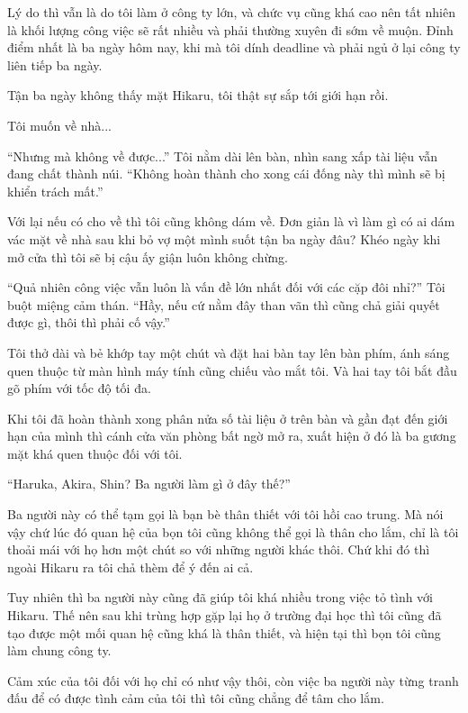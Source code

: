{    Lý do thì vẫn là do tôi làm ở công ty lớn, và chức vụ cũng khá cao nên
    tất nhiên là khối lượng công việc sẽ rất nhiều và phải thường xuyên đi
    sớm về muộn. Đỉnh điểm nhất là ba ngày hôm nay, khi mà tôi dính deadline
    và phải ngủ ở lại công ty liên tiếp ba ngày.

    Tận ba ngày không thấy mặt Hikaru, tôi thật sự sắp tới giới hạn rồi.

    Tôi muốn về nhà...

    ``Nhưng mà không về được...'' Tôi nằm dài lên bàn, nhìn sang xấp tài
    liệu vẫn đang chất thành núi. ``Không hoàn thành cho xong cái đống này
    thì mình sẽ bị khiển trách mất.''

    Với lại nếu có cho về thì tôi cũng không dám về. Đơn giản là vì làm gì
    có ai dám vác mặt về nhà sau khi bỏ vợ một mình suốt tận ba ngày đâu?
    Khéo ngày khi mở cửa thì tôi sẽ bị cậu ấy giận luôn không chừng.

    ``Quả nhiên công việc vẫn luôn là vấn đề lớn nhất đối với các cặp đôi
    nhỉ?'' Tôi buột miệng cảm thán. ``Hầy, nếu cứ nằm đây than vãn thì cũng
    chả giải quyết được gì, thôi thì phải cố vậy.''

    Tôi thở dài và bẻ khớp tay một chút và đặt hai bàn tay lên bàn phím, ánh
    sáng quen thuộc từ màn hình máy tính cũng chiếu vào mắt tôi. Và hai tay
    tôi bắt đầu gõ phím với tốc độ tối đa.

    Khi tôi đã hoàn thành xong phân nửa số tài liệu ở trên bàn và gần đạt
    đến giới hạn của mình thì cánh cửa văn phòng bất ngờ mở ra, xuất hiện ở
    đó là ba gương mặt khá quen thuộc đối với tôi.

    ``Haruka, Akira, Shin? Ba người làm gì ở đây thế?''

    Ba người này có thể tạm gọi là bạn bè thân thiết với tôi hồi cao trung.
    Mà nói vậy chứ lúc đó quan hệ của bọn tôi cũng không thể gọi là thân cho
    lắm, chỉ là tôi thoải mái với họ hơn một chút so với những người khác
    thôi. Chứ khi đó thì ngoài Hikaru ra tôi chả thèm để ý đến ai cả.

    Tuy nhiên thì ba người này cũng đã giúp tôi khá nhiều trong việc tỏ tình
    với Hikaru. Thế nên sau khi trùng hợp gặp lại họ ở trường đại học thì
    tôi cũng đã tạo được một mối quan hệ cũng khá là thân thiết, và hiện tại
    thì bọn tôi cũng làm chung công ty.

    Cảm xúc của tôi đối với họ chỉ có như vậy thôi, còn việc ba người này
    từng tranh đấu để có được tình cảm của tôi thì tôi cũng chẳng để tâm cho
    lắm.

}
